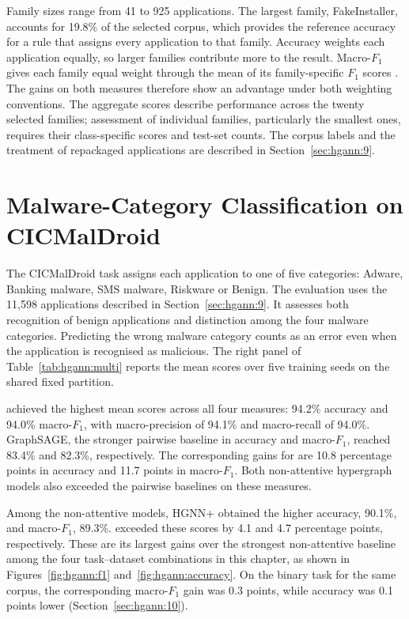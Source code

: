 Family sizes range from 41 to 925 applications. The largest family, FakeInstaller, accounts
for 19.8\% of the selected corpus, which provides the reference accuracy for a rule that assigns
every application to that family. Accuracy weights each application equally, so larger families
contribute more to the result. Macro-$F_1$ gives each family equal weight through the mean of
its family-specific $F_1$ scores \cite{opitz2019macrof1}. The gains on both measures therefore
show an advantage under both weighting conventions. The aggregate scores describe performance
across the twenty selected families; assessment of individual families, particularly the
smallest ones, requires their class-specific scores and test-set counts. The corpus labels and
the treatment of repackaged applications are described in Section~\ref{sec:hgann:9}.

\section{Malware-Category Classification on CICMalDroid}
\label{sec:hgann:12}

The CICMalDroid task assigns each application to one of five categories: Adware, Banking
malware, SMS malware, Riskware or Benign. The evaluation uses the 11,598 applications described
in Section~\ref{sec:hgann:9}. It assesses both recognition of benign applications and
distinction among the four malware categories. Predicting the wrong malware category counts
as an error even when the application is recognised as malicious. The right panel of
Table~\ref{tab:hgann:multi} reports the mean scores over five training seeds on the shared
fixed partition.

\hgann{} achieved the highest mean scores across all four measures: 94.2\% accuracy and
94.0\% macro-$F_1$, with macro-precision of 94.1\% and macro-recall of 94.0\%.
GraphSAGE, the stronger pairwise baseline in accuracy and macro-$F_1$, reached 83.4\% and
82.3\%, respectively. The corresponding gains for \hgann{} are 10.8 percentage points in
accuracy and 11.7 points in macro-$F_1$. Both non-attentive hypergraph models also exceeded
the pairwise baselines on these measures.

Among the non-attentive models, HGNN+ obtained the higher accuracy, 90.1\%, and macro-$F_1$,
89.3\%. \hgann{} exceeded these scores by 4.1 and 4.7 percentage points, respectively.
These are its largest gains over the strongest non-attentive baseline among the four
task--dataset combinations in this chapter, as shown in Figures~\ref{fig:hgann:f1}
and~\ref{fig:hgann:accuracy}. On the binary task for the same corpus, the corresponding
macro-$F_1$ gain was 0.3 points, while accuracy was 0.1 points lower
(Section~\ref{sec:hgann:10}).

